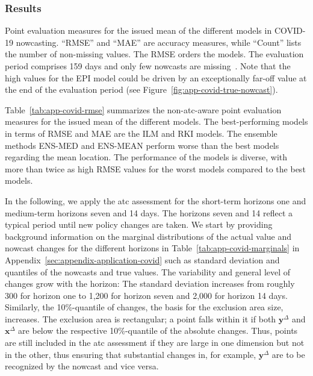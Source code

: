 \documentclass[pdflatex]{sn-jnl}
\theoremstyle{plain}%
\theoremstyle{definition}
\newcommand{\diffx}{\mathbf{x}^{\Delta}}
\newcommand{\diffy}{\mathbf{y}^{\Delta}}
\begin{document}
\subsubsection*{Results}

\begin{table}
    \centering
    
    \caption[Point evaluation measures for the issued mean of the different models in COVID-19 nowcasting.]{Point evaluation measures for the issued mean of the different models in COVID-19 nowcasting. \enquote{RMSE} and \enquote{MAE} are accuracy measures, while \enquote{Count} lists the number of non-missing values. The RMSE orders the models. The evaluation period comprises 159 days and only few nowcasts are missing~\citep[for explanations of the missing values, see][Tables A2, A3, and A4]{Wolffram2023}. Note that the high values for the EPI model could be driven by an exceptionally far-off value at the end of the evaluation period (see Figure~\ref{fig:app-covid-true-nowcast}).}
    \label{tab:app-covid-rmse}
\end{table}

Table~\ref{tab:app-covid-rmse} summarizes the non-\ac{atc}-aware point evaluation measures for the issued mean of the different models.
The best-performing models in terms of RMSE and MAE are the ILM and RKI models.
The ensemble methods ENS-MED and ENS-MEAN perform worse than the best models regarding the mean location.
The performance of the models is diverse, with more than twice as high RMSE values for the worst models compared to the best models.

In the following, we apply the \ac{atc} assessment for the short-term horizons one and medium-term horizons seven and 14 days.
The horizons seven and 14 reflect a typical period until new policy changes are taken.
We start by providing background information on the marginal distributions of the actual value and nowcast changes for the different horizons in Table~\ref{tab:app-covid-marginals} in Appendix~\ref{sec:appendix-application-covid} such as standard deviation and quantiles of the nowcasts and true values.
The variability and general level of changes grow with the horizon: The standard deviation increases from roughly 300 for horizon one to 1,200 for horizon seven and 2,000 for horizon 14 days.
Similarly, the 10\%-quantile of changes, the basis for the exclusion area size, increases.
The exclusion area is rectangular; a point falls within it if both $\diffy$ and $\diffx$ are below the respective 10\%-quantile of the absolute changes.
Thus, points are still included in the \ac{atc} assessment if they are large in one dimension but not in the other, thus ensuring that substantial changes in, for example, $\diffy$ are to be recognized by the nowcast and vice versa.
\end{document}
